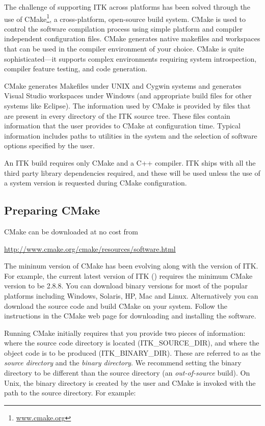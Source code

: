 
The challenge of supporting ITK across platforms has been solved through the
use of CMake\footnote{\url{www.cmake.org}}, a cross-platform, open-source build system.
CMake is used to control the software compilation process using simple platform
and compiler independent configuration files.  CMake generates native makefiles
and workspaces that can be used in the compiler environment of your choice.
CMake is quite sophisticated---it supports complex environments requiring
system introspection, compiler feature testing, and code generation.

CMake generates Makefiles under UNIX and Cygwin systems and generates Visual
Studio workspaces under Windows (and appropriate build files for other systems
like Eclipse). The information used by CMake is provided by
 files that are present in every directory of the ITK
source tree. These files contain information that the user provides to CMake
at configuration time. Typical information includes paths to utilities in the
system and the selection of software options specified by the user.

An ITK build requires only CMake and a C++ compiler. ITK ships with all the
third party library dependencies required, and these will be used unless the
use of a system version is requested during CMake configuration.

\subsection{Preparing CMake}
\label{sec:CMakeforITK}


CMake can be downloaded at no cost from
\begin{center}
  \url{http://www.cmake.org/cmake/resources/software.html}
\end{center}

The mininum version of CMake has been evolving along with the version of ITK.
For example, the current latest version of ITK (\ITKVERSIONMAJORMINOR)
requires the minimum CMake version to be 2.8.8. You can download binary
versions for most of the popular platforms including Windows, Solaris, HP, Mac
and Linux. Alternatively you can download the source code and build CMake on
your system. Follow the instructions in the CMake web page for downloading and
installing the software.

Running CMake initially requires that you provide two pieces of information:
where the source code directory is located (ITK\_SOURCE\_DIR), and where the
object code is to be produced (ITK\_BINARY\_DIR). These are referred to as the
\emph{source directory} and the \emph{binary directory}. We recommend setting
the binary directory to be different than the source directory (an
\emph{out-of-source} build).  On Unix, the binary directory is created by the
user and CMake is invoked with the path to the source directory. For example:

